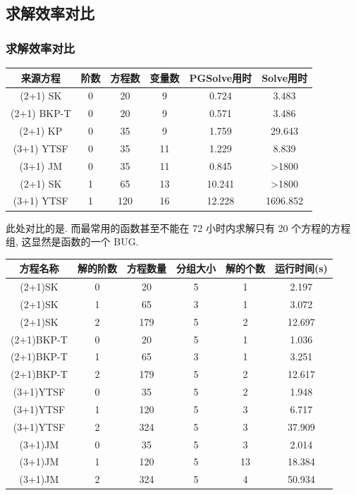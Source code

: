 \subsection{求解效率对比}
\begin{frame}
\frametitle{求解效率对比}
\begin{adjustbox}{max width=\textwidth}
\centering
\renewcommand{\arraystretch}{1.3}
\begin{tabular}{cccccc}
\hline
来源方程 & 阶数 & 方程数 & 变量数 & PGSolve用时 & Solve用时 \\
\hline
(2+1) SK & 0 & 20 & 9 & 0.724 & 3.483 \\
(2+1) BKP-T & 0 & 20 & 9 & 0.571 & 3.486 \\
(2+1) KP & 0 & 35 & 9 & 1.759 & 29.643 \\
(3+1) YTSF & 0 & 35 & 11 & 1.229 & 8.839 \\
(3+1) JM & 0 & 35 & 11 & 0.845 & >1800 \\
(2+1) SK & 1 & 65 & 13 & 10.241 & >1800 \\
(3+1) YTSF & 1 & 120 & 16 & 12.228 & 1696.852 \\
\hline
\end{tabular}
\end{adjustbox}

\vspace{1em}

此处对比的是. 而最常用的函数甚至不能在 72 小时内求解只有 20 个方程的方程组, 这显然是函数的一个 BUG.

\end{frame}

\begin{frame}

\begin{adjustbox}{max width=\textwidth}
\renewcommand{\arraystretch}{1.3}
\begin{tabular}{cccccc}
\hline
方程名称    & 解的阶数 & 方程数量 & 分组大小 & 解的个数 & 运行时间(s) \\ 
\hline 
(2+1)SK & 0 & 20 & 5 & 1 & 2.197 \\
(2+1)SK & 1 & 65 & 3 & 1 & 3.072 \\
(2+1)SK & 2 & 179 & 5 & 2 & 12.697 \\
(2+1)BKP-T & 0 & 20 & 5 & 1 & 1.036 \\
(2+1)BKP-T & 1 & 65 & 3 & 1 & 3.251 \\
(2+1)BKP-T & 2 & 179 & 5 & 2 & 12.617 \\
(3+1)YTSF & 0 & 35 & 5 & 2 & 1.948 \\
(3+1)YTSF & 1 & 120 & 5 & 3 & 6.717 \\
(3+1)YTSF & 2 & 324 & 5 & 3 & 37.909 \\
(3+1)JM & 0 & 35 & 5 & 3 & 2.014 \\
(3+1)JM & 1 & 120 & 5 & 13 & 18.384 \\
(3+1)JM & 2 & 324 & 5 & 4 & 50.934 \\
\hline 
\end{tabular}
\end{adjustbox}

\end{frame}

